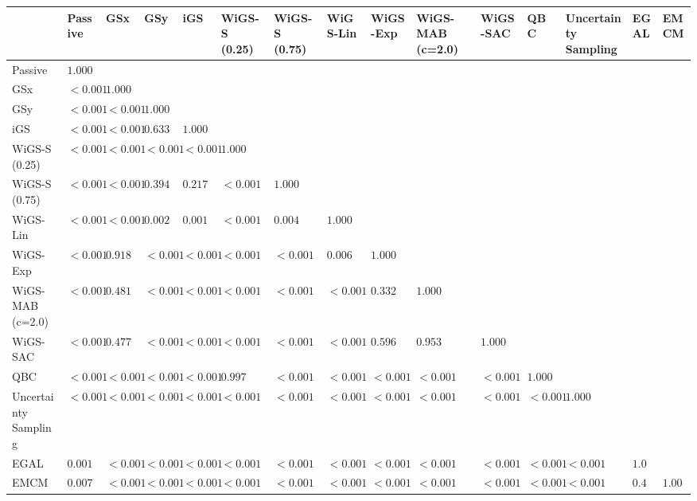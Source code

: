 \begin{tabular}{lllllllllllllll}
\toprule
 & Passive & GSx & GSy & iGS & WiGS-S (0.25) & WiGS-S (0.75) & WiGS-Lin & WiGS-Exp & WiGS-MAB (c=2.0) & WiGS-SAC & QBC & Uncertainty Sampling & EGAL & EMCM \\
\midrule
Passive & $1.000$ &  &  &  &  &  &  &  &  &  &  &  &  &  \\
GSx & $<0.001$ & $1.000$ &  &  &  &  &  &  &  &  &  &  &  &  \\
GSy & $<0.001$ & $<0.001$ & $1.000$ &  &  &  &  &  &  &  &  &  &  &  \\
iGS & $<0.001$ & $<0.001$ & $0.633$ & $1.000$ &  &  &  &  &  &  &  &  &  &  \\
WiGS-S (0.25) & $<0.001$ & $<0.001$ & $<0.001$ & $<0.001$ & $1.000$ &  &  &  &  &  &  &  &  &  \\
WiGS-S (0.75) & $<0.001$ & $<0.001$ & $0.394$ & $0.217$ & $<0.001$ & $1.000$ &  &  &  &  &  &  &  &  \\
WiGS-Lin & $<0.001$ & $<0.001$ & $0.002$ & $0.001$ & $<0.001$ & $0.004$ & $1.000$ &  &  &  &  &  &  &  \\
WiGS-Exp & $<0.001$ & $0.918$ & $<0.001$ & $<0.001$ & $<0.001$ & $<0.001$ & $0.006$ & $1.000$ &  &  &  &  &  &  \\
WiGS-MAB (c=2.0) & $<0.001$ & $0.481$ & $<0.001$ & $<0.001$ & $<0.001$ & $<0.001$ & $<0.001$ & $0.332$ & $1.000$ &  &  &  &  &  \\
WiGS-SAC & $<0.001$ & $0.477$ & $<0.001$ & $<0.001$ & $<0.001$ & $<0.001$ & $<0.001$ & $0.596$ & $0.953$ & $1.000$ &  &  &  &  \\
QBC & $<0.001$ & $<0.001$ & $<0.001$ & $<0.001$ & $0.997$ & $<0.001$ & $<0.001$ & $<0.001$ & $<0.001$ & $<0.001$ & $1.000$ &  &  &  \\
Uncertainty Sampling & $<0.001$ & $<0.001$ & $<0.001$ & $<0.001$ & $<0.001$ & $<0.001$ & $<0.001$ & $<0.001$ & $<0.001$ & $<0.001$ & $<0.001$ & $1.000$ &  &  \\
EGAL & $0.001$ & $<0.001$ & $<0.001$ & $<0.001$ & $<0.001$ & $<0.001$ & $<0.001$ & $<0.001$ & $<0.001$ & $<0.001$ & $<0.001$ & $<0.001$ & $1.000$ &  \\
EMCM & $0.007$ & $<0.001$ & $<0.001$ & $<0.001$ & $<0.001$ & $<0.001$ & $<0.001$ & $<0.001$ & $<0.001$ & $<0.001$ & $<0.001$ & $<0.001$ & $0.479$ & $1.000$ \\
\bottomrule
\end{tabular}
